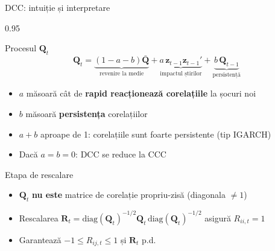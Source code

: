 \documentclass[9pt, aspectratio=169, t]{beamer}
\begin{document}
\begin{frame}{DCC: intuiție și interpretare}
    \begin{cminipage}{0.95\textwidth}
    {\footnotesize
    \begin{block}{Procesul $\mathbf{Q}_t$}
        \[
            \mathbf{Q}_t = \underbrace{(1-a-b)\bar{\mathbf{Q}}}_{\text{revenire la medie}} + \underbrace{a\,\mathbf{z}_{t-1}\mathbf{z}_{t-1}'}_{\text{impactul știrilor}} + \underbrace{b\,\mathbf{Q}_{t-1}}_{\text{persistență}}
        \]
        \begin{itemize}\setlength{\itemsep}{0pt}
            \item $a$ măsoară cât de \textbf{rapid reacționează corelațiile} la șocuri noi
            \item $b$ măsoară \textbf{persistența} corelațiilor
            \item $a + b$ aproape de 1: corelațiile sunt foarte persistente (tip IGARCH)
            \item Dacă $a = b = 0$: DCC se reduce la CCC
        \end{itemize}
    \end{block}
    \begin{block}{Etapa de rescalare}
        \begin{itemize}\setlength{\itemsep}{0pt}
            \item $\mathbf{Q}_t$ \textbf{nu este} matrice de corelație propriu-zisă (diagonala $\neq 1$)
            \item Rescalarea $\mathbf{R}_t = \text{diag}(\mathbf{Q}_t)^{-1/2}\mathbf{Q}_t\,\text{diag}(\mathbf{Q}_t)^{-1/2}$ asigură $R_{ii,t} = 1$
            \item Garantează $-1 \leq R_{ij,t} \leq 1$ și $\mathbf{R}_t$ p.d.
        \end{itemize}
    \end{block}
    }
    \end{cminipage}
\end{frame}
\end{document}
